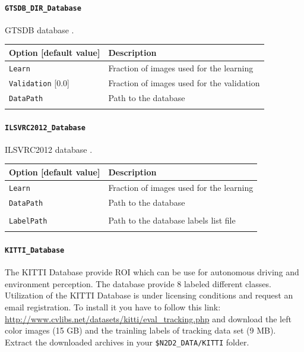\documentclass[a4paper,11pt,oneside]{article}
\begin{document}
\paragraph{\texorpdfstring{%
\lstinline[basicstyle=\ttfamily\bfseries]!GTSDB_DIR_Database!}
{GTSDB\_DIR\_Database}}
GTSDB database \citep{Houben2013}.

\begin{center}
 \begin{tabular}{| p{5cm} | p{10cm} | }
 \hline
 Option [default value] & Description\\
 \hline\hline
  \lstinline!Learn! & Fraction of images used for the learning \\
  \lstinline!Validation! [0.0] & Fraction of images used for the validation \\
  \lstinline!DataPath! & Path to the database \\
   & \\
 \hline
\end{tabular}
\end{center}


\paragraph{\texorpdfstring{%
\lstinline[basicstyle=\ttfamily\bfseries]!ILSVRC2012_Database!}
{ILSVRC2012\_Database}}
ILSVRC2012 database \citep{ILSVRC15}.

\begin{center}
 \begin{tabular}{| p{5cm} | p{10cm} | }
 \hline
 Option [default value] & Description\\
 \hline\hline
  \cellcolor{requiredcolor}
  \lstinline!Learn! & Fraction of images used for the learning \\
  \lstinline!DataPath! & Path to the database \\
   & \\
  \lstinline!LabelPath! & Path to the database labels list file \\
   & \\
 \hline
\end{tabular}
\end{center}

\paragraph{\texorpdfstring{%
\lstinline[basicstyle=\ttfamily\bfseries]!KITTI_Database!}{KITTI\_Database}}
The KITTI Database provide ROI which can be use for autonomous driving and environment perception.
The database provide 8 labeled different classes. Utilization of the KITTI
Database is under licensing conditions and request an email registration. To install it you have to
follow this link:
\url{http://www.cvlibs.net/datasets/kitti/eval_tracking.php} and download the left color images (15 GB) and
the trainling labels of tracking data set (9 MB). Extract the downloaded archives in your
\lstinline[basicstyle=\ttfamily\bfseries]!$N2D2_DATA/KITTI! folder.
\end{document}

